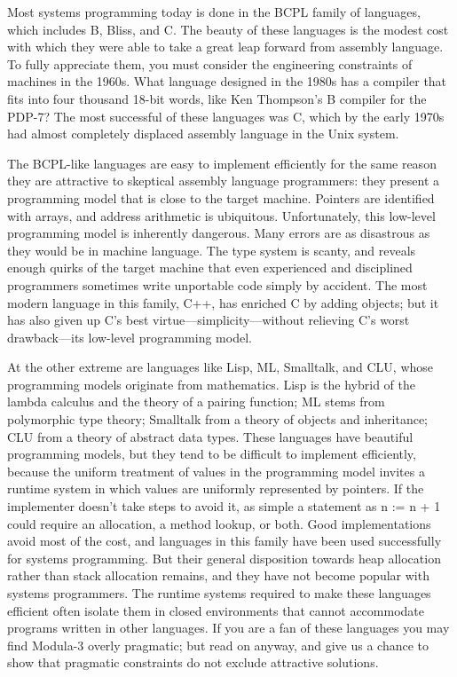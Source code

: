 \documentclass[10pt]{article}
\begin{document}
Most systems programming today is done in the BCPL family of languages, which
includes B, Bliss, and C.  The beauty of these languages is the modest cost
with which they were able to take a great leap forward from assembly language.
To fully appreciate them, you must consider the engineering constraints of
machines in the 1960s.  What language designed in the 1980s has a compiler
that fits into four thousand 18-bit words, like Ken Thompson's B compiler for
the PDP-7? The most successful of these languages was C, which by the early
1970s had almost completely displaced assembly language in the Unix system.

The BCPL-like languages are easy to implement efficiently for the same reason
they are attractive to skeptical assembly language programmers: they present a
programming model that is close to the target machine.  Pointers are
identified with arrays, and address arithmetic is ubiquitous.  Unfortunately,
this low-level programming model is inherently dangerous.  Many errors are as
disastrous as they would be in machine language.  The type system is scanty,
and reveals enough quirks of the target machine that even experienced and
disciplined programmers sometimes write unportable code simply by accident.
The most modern language in this family, C++, has enriched C by adding
objects; but it has also given up C's best virtue---simplicity---without
relieving C's worst drawback---its low-level programming model.

At the other extreme are languages like Lisp, ML, Smalltalk, and CLU, whose
programming models originate from mathematics.  Lisp is the hybrid of the
lambda calculus and the theory of a pairing function; ML stems from
polymorphic type theory; Smalltalk from a theory of objects and inheritance;
CLU from a theory of abstract data types.  These languages have beautiful
programming models, but they tend to be difficult to implement efficiently,
because the uniform treatment of values in the programming model invites a
runtime system in which values are uniformly represented by pointers.  If the
implementer doesn't take steps to avoid it, as simple a statement as n := n +
1 could require an allocation, a method lookup, or both.  Good implementations
avoid most of the cost, and languages in this family have been used
successfully for systems programming.  But their general disposition towards
heap allocation rather than stack allocation remains, and they have not become
popular with systems programmers.  The runtime systems required to make these
languages efficient often isolate them in closed environments that cannot
accommodate programs written in other languages.  If you are a fan of these
languages you may find Modula-3 overly pragmatic; but read on anyway, and give
us a chance to show that pragmatic constraints do not exclude attractive
solutions.
\end{document}
